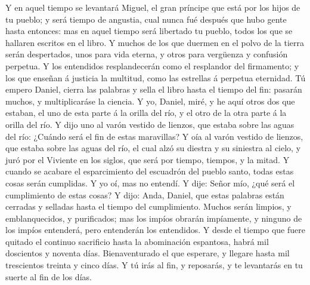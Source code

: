  Y en aquel tiempo se levantará Miguel, el gran príncipe que
está por los hijos de tu pueblo; y será tiempo de angustia, cual nunca
fué después que hubo gente hasta entonces: mas en aquel tiempo será
libertado tu pueblo, todos los que se hallaren escritos en el libro.
 Y muchos de los que duermen en el polvo de la tierra serán
despertados, unos para vida eterna, y otros para vergüenza y confusión
perpetua.  Y los entendidos resplandecerán como el
resplandor del firmamento; y los que enseñan á justicia la multitud,
como las estrellas á perpetua eternidad.  Tú empero Daniel,
cierra las palabras y sella el libro hasta el tiempo del fin: pasarán
muchos, y multiplicaráse la ciencia.  Y yo, Daniel, miré, y
he aquí otros dos que estaban, el uno de esta parte á la orilla del río,
y el otro de la otra parte á la orilla del río.  Y dijo uno
al varón vestido de lienzos, que estaba sobre las aguas del río: ¿Cuándo
será el fin de estas maravillas?  Y oía al varón vestido de
lienzos, que estaba sobre las aguas del río, el cual alzó su diestra y
su siniestra al cielo, y juró por el Viviente en los siglos, que será
por tiempo, tiempos, y la mitad. Y cuando se acabare el esparcimiento
del escuadrón del pueblo santo, todas estas cosas serán cumplidas.
 Y yo oí, mas no entendí. Y dije: Señor mío, ¿qué será el
cumplimiento de estas cosas?  Y dijo: Anda, Daniel, que
estas palabras están cerradas y selladas hasta el tiempo del
cumplimiento.  Muchos serán limpios, y emblanquecidos, y
purificados; mas los impíos obrarán impíamente, y ninguno de los impíos
entenderá, pero entenderán los entendidos.  Y desde el
tiempo que fuere quitado el continuo sacrificio hasta la abominación
espantosa, habrá mil doscientos y noventa días. 
Bienaventurado el que esperare, y llegare hasta mil trescientos treinta
y cinco días.  Y tú irás al fin, y reposarás, y te
levantarás en tu suerte al fin de los días.
